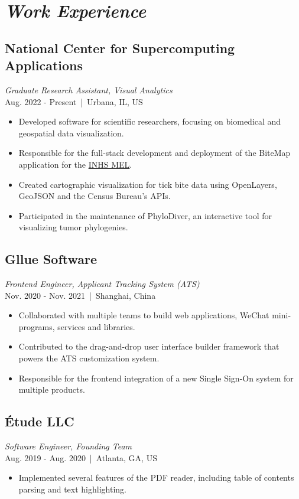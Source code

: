 \documentclass[11pt]{article}
\begin{document}
\begin{minipage}{280pt}

\section*{\it Work Experience}

\subsection*{National Center for Supercomputing Applications}
\textit{Graduate Research Assistant, Visual Analytics} \\
Aug. 2022 - Present \,|\, Urbana, IL, US\\
\begin{itemize}
\item Developed software for scientific researchers, focusing on biomedical and geospatial data visualization.
\item Responsible for the full-stack development and deployment of the BiteMap application for the \href{https://medical-entomology.inhs.illinois.edu/}{INHS MEL}.
\item Created cartographic visualization for tick bite data using OpenLayers, GeoJSON and the Census Bureau's APIs.
\item Participated in the maintenance of PhyloDiver, an interactive tool for visualizing tumor phylogenies.
\end{itemize}

\subsection*{Gllue Software}
\textit{Frontend Engineer, Applicant Tracking System (ATS)}\\
Nov. 2020 - Nov. 2021 \,|\, Shanghai, China\\
\begin{itemize}
\item Collaborated with multiple teams to build web applications, WeChat mini-programs, services and libraries.
\item Contributed to the drag-and-drop user interface builder framework that powers the ATS customization system.
\item Responsible for the frontend integration of a new Single Sign-On system for multiple products.
\end{itemize}

\subsection*{Étude LLC}
\textit{Software Engineer, Founding Team}\\
Aug. 2019 - Aug. 2020 \,|\,  Atlanta, GA, US\\
\begin{itemize}
\item Implemented several features of the PDF reader, including table of contents parsing and text highlighting.
\end{itemize}


\end{minipage}
\end{document}
